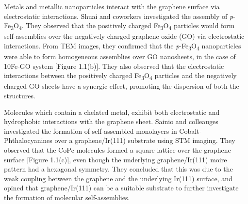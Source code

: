 Metals and metallic nanoparticles interact with the graphene surface via electrostatic interactions. Shuai and coworkers investigated the assembly of \textit{p}-Fe\textsubscript{3}O\textsubscript{4}.\supercite{yang_electrostatic_2020}  They observed that the positively charged Fe\textsubscript{3}O\textsubscript{4} particles would form self-assemblies over the negatively charged graphene oxide (GO) via electrostatic interactions. From TEM images, they confirmed that the \textit{p}-Fe\textsubscript{3}O\textsubscript{4} nanoparticles were able to form homogeneous assemblies over GO nanosheets, in the case of 10Fe-GO system [Figure 1.1(b)]. They also observed that the electrostatic interactions between the positively charged Fe\textsubscript{3}O\textsubscript{4} particles and the negatively charged GO sheets have a synergic effect, promoting the dispersion of both the structures.

Molecules which contain a chelated metal, exhibit both electrostatic and hydrophobic interactions with the graphene sheet. Sainio and colleauges investigated the formation of self-assembled monolayers in Cobalt-Phthalocyanines over a graphene/Ir(111) substrate using STM imaging.\supercite{hamalainen_self-assembly_2012} They observed that the CoPc molecules formed a square lattice over the graphene surface [Figure 1.1(c)], even though the underlying graphene/Ir(111) moire pattern had a hexagonal symmetry. They concluded that this was due to the weak coupling between the graphene and the underlying Ir(111) surface, and opined that graphene/Ir(111) can be a suitable substrate to further investigate the formation of molecular self-assemblies.

